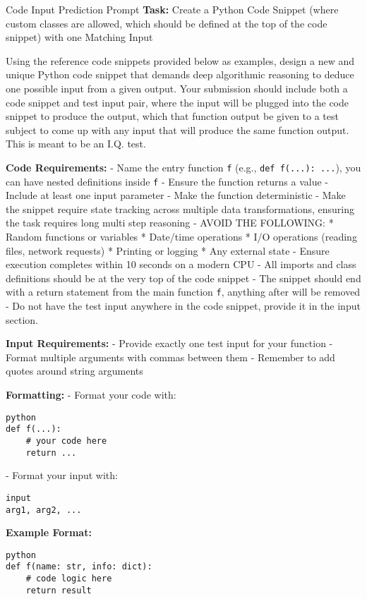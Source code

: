\documentclass[10pt,a4paper]{article}
\begin{document}
\begin{promptbox}{Code Input Prediction Prompt}
\footnotesize
\textbf{Task:} Create a Python Code Snippet (where custom classes are allowed, which should be defined at the top of the code snippet) with one Matching Input

Using the reference code snippets provided below as examples, design a new and unique Python code snippet that demands deep algorithmic reasoning to deduce one possible input from a given output. Your submission should include both a code snippet and test input pair, where the input will be plugged into the code snippet to produce the output, which that function output be given to a test subject to come up with any input that will produce the same function output. This is meant to be an I.Q. test.

\textbf{Code Requirements:}
- Name the entry function \texttt{f} (e.g., \texttt{def f(...): ...}), you can have nested definitions inside \texttt{f}
- Ensure the function returns a value
- Include at least one input parameter
- Make the function deterministic
- Make the snippet require state tracking across multiple data transformations, ensuring the task requires long multi step reasoning
- AVOID THE FOLLOWING:
  * Random functions or variables
  * Date/time operations
  * I/O operations (reading files, network requests)
  * Printing or logging
  * Any external state
- Ensure execution completes within 10 seconds on a modern CPU
- All imports and class definitions should be at the very top of the code snippet
- The snippet should end with a return statement from the main function \texttt{f}, anything after will be removed
- Do not have the test input anywhere in the code snippet, provide it in the input section.

\textbf{Input Requirements:}
- Provide exactly one test input for your function
- Format multiple arguments with commas between them
- Remember to add quotes around string arguments

\textbf{Formatting:}
- Format your code with: \begin{verbatim}python
def f(...):
    # your code here
    return ...
\end{verbatim}
- Format your input with: \begin{verbatim}input
arg1, arg2, ...
\end{verbatim}

\textbf{Example Format:}
\begin{verbatim}python
def f(name: str, info: dict):
    # code logic here
    return result
\end{verbatim}


\end{promptbox}
\end{document}
